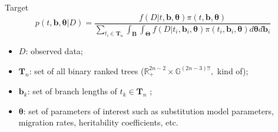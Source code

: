 \documentclass[newPxFont,numfooter,sectionpages]{beamer}
\begin{document}
\begin{frame}{Target}
\begin{equation}
\label{eq:posterior}
 p(t, \boldsymbol b, \boldsymbol \theta | D) = \frac{f(D | t, \boldsymbol b, \boldsymbol \theta ) \pi(t, \boldsymbol b, \boldsymbol \theta )}{\sum_{t_i \in \boldsymbol T_n} \int_{\boldsymbol B}\int_{\boldsymbol \Theta} f(D | t_i, \boldsymbol b_i, \boldsymbol \theta ) \pi(t_i, \boldsymbol b_i, \boldsymbol \theta ) d\boldsymbol\theta d\boldsymbol b_i}
\end{equation}
\begin{itemize}
 \item $D$: observed data;
 \item $\boldsymbol T_n$: set of all binary ranked trees ($\mathbb{R}^{2n-2}_+ \times \mathbb{G} ^{(2n-3)!!}, $ kind of);
 \item  $\boldsymbol b_k$: set of branch lengths of $t_k \in \boldsymbol T_n$ ;
 \item $\boldsymbol \theta$: set of parameters of interest such as substitution model parameters, migration rates, heritability coefficients, etc.
\end{itemize}
\end{frame}
\end{document}
